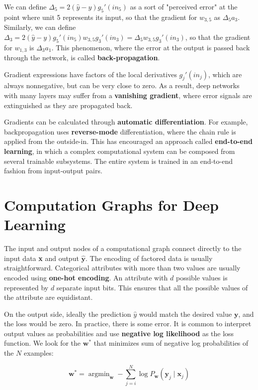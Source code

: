 \documentclass{article}
\DeclareMathOperator*{\argmin}{argmin}
\begin{document}
We can define $\Delta_5 = 2(\hat y - y) g_5'(in_5)$ as a sort of "perceived error"
at the point where unit 5 represents its input, so that the gradient for $w_{3,5}$ as
$\Delta_5 a_3$. Similarly, we can define $\Delta_3 = 2(\hat y - y) g_5'(in_5) w_{3,5} g_3'(in_3) = \Delta_5 w_{3,5} g_3'(in_3)$,
so that the gradient for $w_{1,3}$ is $\Delta_3 a_1$. This phenomenon, where the
error at the output is passed back through the network, is called \textbf{back-propagation}.

Gradient expressions have factors of the local derivatives $g_j'(in_j)$, which
are always nonnegative, but can be very close to zero. As a result, deep networks
with many layers may suffer from a \textbf{vanishing gradient}, where error signals
are extinguished as they are propagated back.

Gradients can be calculated through \textbf{automatic differentiation}. For example,
backpropagation uses \textbf{reverse-mode} differentiation, where the chain rule is
applied from the outside-in. This has encouraged an approach called \textbf{end-to-end
learning}, in which a complex computational system can be composed from several
trainable subsystems. The entire system is trained in an end-to-end fashion from
input-output pairs.

\section{Computation Graphs for Deep Learning}

The input and output nodes of a computational graph connect directly to the input
data \textbf{x} and output $\mathbf{\hat y}$. The encoding of factored data is usually
straightforward. Categorical attributes with more than two values are usually encoded
using \textbf{one-hot encoding}. An attribute with $d$ possible values is represented by 
$d$ separate input bits. This ensures that all the possible values of the attribute
are equidistant.

On the output side, ideally the prediction $\hat y$ would match the desired value
$\textbf{y}$, and the loss would be zero. In practice, there is some error. It is common
to interpret output values as probabilities and use \textbf{negative log likelihood}
as the loss function. We look for the $\textbf{w}^*$ that minimizes sum of negative log
probabilities of the $N$ examples:

\[
\textbf{w}^* = \argmin_{\textbf{w}} -\sum_{j=i}^N \log P_{\textbf{w}}(\textbf{y}_j \mid \textbf{x}_j)
\]
\end{document}
